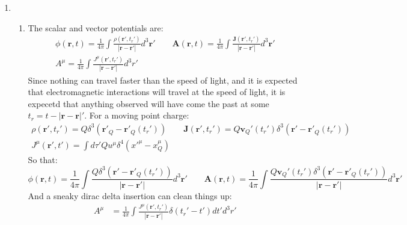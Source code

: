 \documentclass[12pt,a4]{article}
\begin{document}
\begin{enumerate}
  \item
    \begin{enumerate}
      \item
        The scalar and vector potentials are:
        \begin{gather*}
          \phi(\mathbf{r}, t) = \frac{1}{4 \pi}\int\frac{\rho (\mathbf{r}', t_r')}{|\mathbf{r} - \mathbf{r}'|} d^3\mathbf{r}' \qquad
          \mathbf{A}(\mathbf{r}, t) = \frac{1}{4 \pi}\int\frac{\mathbf{J} (\mathbf{r}', t_r')}{|\mathbf{r} - \mathbf{r}'|} d^3\mathbf{r}'\\
          A^\mu = \frac{1}{4 \pi}\int \frac{J^\mu (\mathbf{r}', t_r')}{|\mathbf{r} - \mathbf{r}'|} d^3r'
        \end{gather*}
        Since nothing can travel faster than the speed of light, and it is expected that electromagnetic interactions will travel at the speed of light, it is expecetd that anything observed will have come the past at some $t_r = t - |\mathbf{r} - \mathbf{r}|'$.
        For a moving point charge:
        \begin{gather*}
          \rho (\mathbf{r}', t_r') = Q \delta^3(\mathbf{r'}_Q - \mathbf{r'}_Q(t_r')) \qquad
          \mathbf{J} (\mathbf{r}', t_r') = Q \mathbf{v}_Q'(t_r') \delta^3(\mathbf{r'} - \mathbf{r'}_Q(t_r'))\\
          J^\mu (\mathbf{r}', t') = \int d\tau' Q u^\mu \delta^4(x'^\mu - x_Q^\mu)
        \end{gather*}
        So that:
        \begin{equation*}
          \phi(\mathbf{r}, t) = \frac{1}{4 \pi}\int\frac{Q \delta^3(\mathbf{r'} - \mathbf{r'}_Q(t_r'))}{|\mathbf{r} - \mathbf{r}'|} d^3\mathbf{r}' \qquad
          \mathbf{A}(\mathbf{r}, t) = \frac{1}{4 \pi}\int\frac{Q \mathbf{v}_Q'(t_r') \delta^3(\mathbf{r'} - \mathbf{r'}_Q(t_r'))}{|\mathbf{r} - \mathbf{r}'|} d^3\mathbf{r}'
        \end{equation*}
        And a sneaky dirac delta insertion can clean things up:
        \begin{align*}
          A^\mu &= \frac{1}{4 \pi}\int \frac{J^\mu (\mathbf{r}', t_r')}{|\mathbf{r} - \mathbf{r}'|} \delta(t_r' - t')dt' d^3 r'\\

\end{align*}
\end{enumerate}
\end{enumerate}
\end{document}

